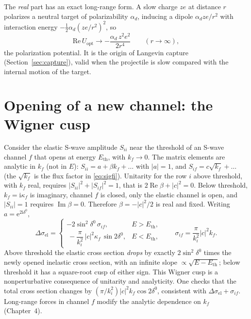 \documentclass[11pt,a4paper]{book}
\numberwithin{equation}{chapter}
\newcommand{\ii}{\mathrm{i}}
\newcommand{\ee}{\mathrm{e}}
\newcommand{\Imag}{\operatorname{Im}}
\newcommand{\Real}{\operatorname{Re}}
\begin{document}
The \emph{real} part has an exact long-range form. A slow charge $ze$ at distance
$r$ polarizes a neutral target of polarizability $\alpha_d$, inducing a dipole
$\alpha_dze/r^2$ with interaction energy $-\tfrac12\alpha_d(ze/r^2)^2$, so
\begin{equation}\label{eq:Vpol}
  \mathrm{Re}\,U_{\mathrm{opt}}\to-\frac{\alpha_d\,z^2e^2}{2r^4}\qquad(r\to\infty),
\end{equation}
the polarization potential. It is the origin of Langevin capture
(Section~\ref{sec:capture}), valid when the projectile is slow compared with the
internal motion of the target.

\section{Opening of a new channel: the Wigner cusp}

Consider the elastic S-wave amplitude $S_{ii}$ near the threshold of an S-wave
channel $f$ that opens at energy $E_{\mathrm{th}}$, with $k_f\to0$. The matrix
elements are analytic in $k_f$ (not in $E$): $S_{ii}=a+\beta k_f+\dots$ with
$|a|=1$, and $S_{if}=c\sqrt{k_f}+\dots$ (the $\sqrt{k_f}$ is the flux factor in
\eqref{eq:sigfi}). Unitarity for the row $i$ above threshold, with $k_f$ real,
requires $|S_{ii}|^2+|S_{if}|^2=1$, that is $2\Real\beta+|c|^2=0$. Below
threshold, $k_f=\ii\kappa_f$ is imaginary, channel $f$ is closed, only the
elastic channel is open, and $|S_{ii}|=1$ requires $\Imag\beta=0$. Therefore
$\beta=-|c|^2/2$ is real and fixed. Writing $a=\ee^{2\ii\delta^0}$,
\begin{equation}\label{eq:cusp}
  \Delta\sigma_{\mathrm{el}}=
  \begin{cases}
   -2\sin^2\delta^0\,\sigma_{if}, & E>E_{\mathrm{th}},\\[2pt]
   \ -\dfrac{\pi}{k_i^2}\,|c|^2\kappa_f\,\sin2\delta^0, & E<E_{\mathrm{th}},
  \end{cases}
  \qquad \sigma_{if}=\frac{\pi}{k_i^2}|c|^2k_f .
\end{equation}
Above threshold the elastic cross section \emph{drops} by exactly
$2\sin^2\delta^0$ times the newly opened inelastic cross section, with an
infinite slope $\propto\sqrt{E-E_{\mathrm{th}}}$; below threshold it has a
square-root cusp of either sign. This Wigner cusp is a nonperturbative
consequence of unitarity and analyticity. One checks that the total cross section
changes by $(\pi/k_i^2)|c|^2k_f\cos2\delta^0$, consistent with
$\Delta\sigma_{\mathrm{el}}+\sigma_{if}$. Long-range forces in channel $f$ modify
the analytic dependence on $k_f$ (Chapter~4).
\end{document}
